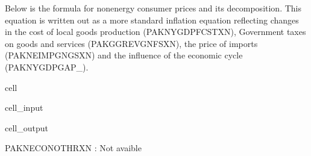 \documentclass[letterpaper,10pt,english]{jupyterBook}
\begin{document}
\sphinxAtStartPar
Below is the formula for nonenergy consumer prices and its decomposition. This equation is written out as a more standard inflation equation reflecting changes in the cost of local goods production (PAKNYGDPFCSTXN), Government taxes on goods and services (PAKGGREVGNFSXN), the price of imports (PAKNEIMPGNGSXN) and the influence of the economic cycle (PAKNYGDPGAP\_).

\begin{sphinxuseclass}{cell}\begin{sphinxVerbatimInput}

\begin{sphinxuseclass}{cell_input}
\begin{sphinxVerbatim}[commandchars=\\\{\}]
\PYG{p}{[}\PYG{p}{]}
\end{sphinxVerbatim}

\end{sphinxuseclass}\end{sphinxVerbatimInput}
\begin{sphinxVerbatimOutput}

\begin{sphinxuseclass}{cell_output}
\begin{sphinxVerbatim}[commandchars=\\\{\}]
PAKNECONOTHRXN : Not avaible
\end{sphinxVerbatim}

\end{sphinxuseclass}\end{sphinxVerbatimOutput}

\end{sphinxuseclass}
\end{document}
